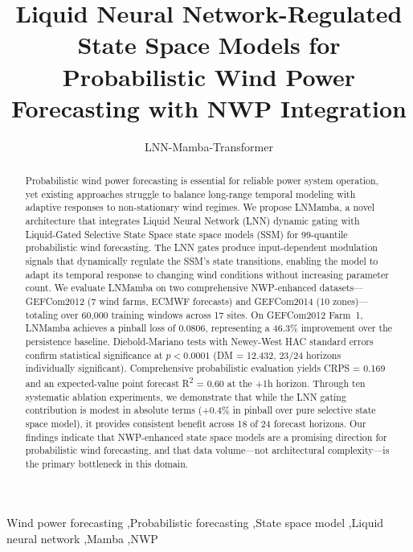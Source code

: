 \documentclass[review]{elsarticle}
\begin{document}
\begin{frontmatter}

\title{Liquid Neural Network-Regulated State Space Models for Probabilistic Wind Power Forecasting with NWP Integration}

\author{LNN-Mamba-Transformer}

\begin{abstract}
Probabilistic wind power forecasting is essential for reliable power system operation, yet existing approaches struggle to balance long-range temporal modeling with adaptive responses to non-stationary wind regimes. We propose LNMamba, a novel architecture that integrates Liquid Neural Network (LNN) dynamic gating with Liquid-Gated Selective State Space state space models (SSM) for 99-quantile probabilistic wind forecasting. The LNN gates produce input-dependent modulation signals that dynamically regulate the SSM's state transitions, enabling the model to adapt its temporal response to changing wind conditions without increasing parameter count. We evaluate LNMamba on two comprehensive NWP-enhanced datasets---GEFCom2012 (7 wind farms, ECMWF forecasts) and GEFCom2014 (10 zones)---totaling over 60,000 training windows across 17 sites. On GEFCom2012 Farm~1, LNMamba achieves a pinball loss of 0.0806, representing a 46.3\% improvement over the persistence baseline. Diebold-Mariano tests with Newey-West HAC standard errors confirm statistical significance at $p < 0.0001$ (DM = 12.432, 23/24 horizons individually significant). Comprehensive probabilistic evaluation yields CRPS = 0.169 and an expected-value point forecast R\textsuperscript{2} = 0.60 at the +1h horizon. Through ten systematic ablation experiments, we demonstrate that while the LNN gating contribution is modest in absolute terms (+0.4\% in pinball over pure selective state space model), it provides consistent benefit across 18 of 24 forecast horizons. Our findings indicate that NWP-enhanced state space models are a promising direction for probabilistic wind forecasting, and that data volume---not architectural complexity---is the primary bottleneck in this domain.

\end{abstract}

\begin{keyword}
Wind power forecasting \sep Probabilistic forecasting \sep State space model \sep Liquid neural network \sep Mamba \sep NWP
\end{keyword}

\end{frontmatter}
\end{document}

